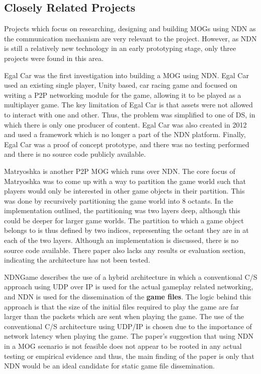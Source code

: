 \subsection{Closely Related Projects}
Projects which focus on researching, designing and building MOGs using NDN as the communication mechanism are very relevant to the project. However, as NDN is still a relatively new technology in an early prototyping stage, only three projects were found in this area.

Egal Car \cite{egal-car} was the first investigation into building a MOG using NDN. Egal Car used an existing single player, Unity based, car racing game and focused on writing a P2P networking module for the game, allowing it to be played as a multiplayer game. The key limitation of Egal Car is that assets were not allowed to interact with one and other. Thus, the problem was simplified to one of DS, in which there is only one producer of content. Egal Car was also created in 2012 and used a framework which is no longer a part of the NDN platform. Finally, Egal Car was a proof of concept prototype, and there was no testing performed and there is no source code publicly available. 

Matryoshka \cite{ndn-multiplayer-game} is another P2P MOG which runs over NDN. The core focus of Matryoshka was to come up with a way to partition the game world such that players would only be interested in other game objects in their partition. This was done by recursively partitioning the game world into 8 octants. In the implementation outlined, the partitioning was two layers deep, although this could be deeper for larger game worlds. The partition to which a game object belongs to is thus defined by two indices, representing the octant they are in at each of the two layers. Although an implementation is discussed, there is no source code available. There paper also lacks any results or evaluation section, indicating the architecture has not been tested.   

NDNGame \cite{ndn-game} describes the use of a hybrid architecture in which a conventional C/S approach using UDP over IP is used for the actual gameplay related networking, and NDN is used for the dissemination of the \textbf{game files}. The logic behind this approach is that the size of the initial files required to play the game are far larger than the packets which are sent when playing the game. The use of the conventional C/S architecture using UDP/IP is chosen due to the importance of network latency when playing the game. The paper's suggestion that using NDN in a MOG scenario is not feasible does not appear to be rooted in any actual testing or empirical evidence and thus, the main finding of the paper is only that NDN would be an ideal candidate for static game file dissemination.  

